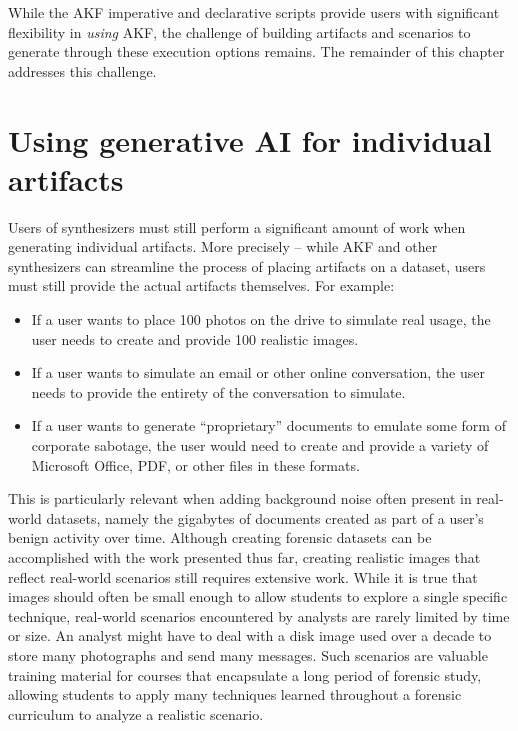 \documentclass[letterpaper,12pt]{report}
\def\tightlist{}
\begin{document}
While the AKF imperative and declarative scripts provide users with
significant flexibility in \emph{using} AKF, the challenge of building
artifacts and scenarios to generate through these execution options
remains. The remainder of this chapter addresses this challenge.

\section{Using generative AI for individual
artifacts}\label{using-generative-ai-for-individual-artifacts}

Users of synthesizers must still perform a significant amount of work
when generating individual artifacts. More precisely -- while AKF and
other synthesizers can streamline the process of placing artifacts on a
dataset, users must still provide the actual artifacts themselves. For
example:

\begin{itemize}
\tightlist
\item
  If a user wants to place 100 photos on the drive to simulate real
  usage, the user needs to create and provide 100 realistic images.
\item
  If a user wants to simulate an email or other online conversation, the
  user needs to provide the entirety of the conversation to simulate.
\item
  If a user wants to generate ``proprietary'' documents to emulate some
  form of corporate sabotage, the user would need to create and provide
  a variety of Microsoft Office, PDF, or other files in these formats.
\end{itemize}

This is particularly relevant when adding background noise often present
in real-world datasets, namely the gigabytes of documents created as
part of a user's benign activity over time. Although creating forensic
datasets can be accomplished with the work presented thus far, creating
realistic images that reflect real-world scenarios still requires
extensive work. While it is true that images should often be small
enough to allow students to explore a single specific technique,
real-world scenarios encountered by analysts are rarely limited by time
or size. An analyst might have to deal with a disk image used over a
decade to store many photographs and send many messages. Such scenarios
are valuable training material for courses that encapsulate a long
period of forensic study, allowing students to apply many techniques
learned throughout a forensic curriculum to analyze a realistic
scenario.
\end{document}
